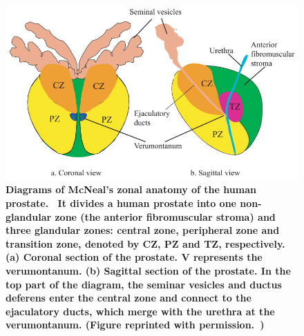 \begin{figure}
\centering
\includegraphics[width=0.75\linewidth]{figs/Mcneal_Zonal_Anatomy.jpg}
\caption{\textbf{Diagrams of McNeal’s zonal anatomy of the human
    prostate.~\cite{mcneal_path} It divides a human prostate into one
    non-glandular zone (the anterior fibromuscular stroma) and three glandular
    zones: central zone, peripheral zone and transition zone, denoted by CZ, PZ
    and TZ, respectively. (a) Coronal section of the prostate. V represents the
    verumontanum. (b) Sagittal section of the prostate. In the top part of the
    diagram, the seminar vesicles and ductus deferens enter the central zone
    and connect to the ejaculatory ducts, which merge with the urethra at the
    verumontanum. (Figure reprinted with permission.~\cite{Zhai2010a})}}
\label{fig:mcneal_anatomy} 
\end{figure}
